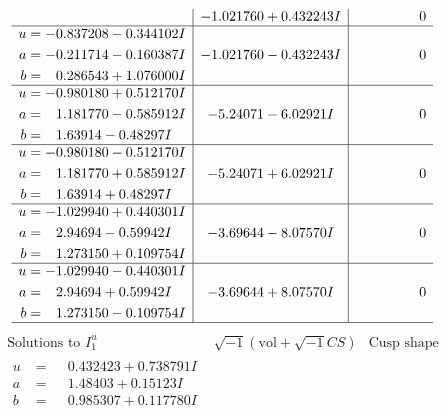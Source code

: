 \documentclass[1p]{elsarticle_modified}
\theoremstyle{definition}
\newcommand{\I}{\sqrt{-1}}
\begin{document}
$$\begin{array}{c|c|c}
 & -1.021760 + 0.432243 I & \phantom{-0.000000 } 0 \\ \hline\begin{aligned}
u &= -0.837208 - 0.344102 I \\
a &= -0.211714 - 0.160387 I \\
b &= \phantom{-}0.286543 + 1.076000 I\end{aligned}
 & -1.021760 - 0.432243 I & \phantom{-0.000000 } 0 \\ \hline\begin{aligned}
u &= -0.980180 + 0.512170 I \\
a &= \phantom{-}1.181770 - 0.585912 I \\
b &= \phantom{-}1.63914 - 0.48297 I\end{aligned}
 & -5.24071 - 6.02921 I & \phantom{-0.000000 } 0 \\ \hline\begin{aligned}
u &= -0.980180 - 0.512170 I \\
a &= \phantom{-}1.181770 + 0.585912 I \\
b &= \phantom{-}1.63914 + 0.48297 I\end{aligned}
 & -5.24071 + 6.02921 I & \phantom{-0.000000 } 0 \\ \hline\begin{aligned}
u &= -1.029940 + 0.440301 I \\
a &= \phantom{-}2.94694 - 0.59942 I \\
b &= \phantom{-}1.273150 + 0.109754 I\end{aligned}
 & -3.69644 - 8.07570 I & \phantom{-0.000000 } 0 \\ \hline\begin{aligned}
u &= -1.029940 - 0.440301 I \\
a &= \phantom{-}2.94694 + 0.59942 I \\
b &= \phantom{-}1.273150 - 0.109754 I\end{aligned}
 & -3.69644 + 8.07570 I & \phantom{-0.000000 } 0\\
 \hline 
 \end{array}$$\newpage$$\begin{array}{c|c|c}  
\text{Solutions to }I^u_{1}& \I (\text{vol} + \sqrt{-1}CS) & \text{Cusp shape}\\
 \hline 
\begin{aligned}
u &= \phantom{-}0.432423 + 0.738791 I \\
a &= \phantom{-}1.48403 + 0.15123 I \\
b &= \phantom{-}0.985307 + 0.117780 I\end{aligned}

\end{array}$$
\end{document}
